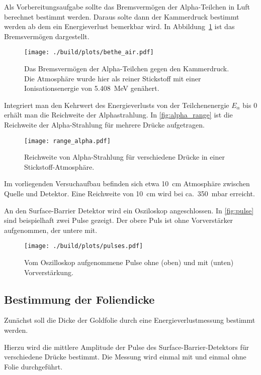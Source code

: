 Als Vorbereitungsaufgabe sollte das Bremsvermögen
der Alpha-Teilchen in Luft berechnet bestimmt werden. Daraus solte dann der Kammerdruck bestimmt werden ab dem  ein Energieverlust
bemerkbar wird. In Abbildung~\ref{fig:bethe} ist das Bremsvermögen dargestellt.

\begin{figure}
  \centering
  \texttt{[image: ./build/plots/bethe\_air.pdf]}
  \caption{Das Bremsvermögen der Alpha-Teilchen gegen den Kammerdruck. Die Atmosphäre wurde hier als reiner Stickstoff mit einer Ionisationsenergie von \SI{5.408}{\MeV} genähert.}
  \label{fig:bethe}
\end{figure}

Integriert man den Kehrwert des Energieverlusts von der Teilchenenergie $E_{\alpha}$ bis $0$ erhält man die Reichweite der Alphastrahlung.
In \autoref{fig:alpha_range} ist die Reichweite der Alpha-Strahlung für mehrere Drücke aufgetragen.

\begin{figure}
  \centering
  \texttt{[image: range\_alpha.pdf]}
  \caption{Reichweite von Alpha-Strahlung für verschiedene Drücke in einer Stickstoff-Atmosphäre.}
  \label{fig:alpha_range}
\end{figure}

Im vorliegenden Versuchaufbau befinden sich etwa \SI{10}{\cm} Atmosphäre zwischen Quelle und Detektor.
Eine Reichweite von \SI{10}{\centi\meter} wird bei ca.\  \SI{350}{\milli\bar} erreicht.

An den Surface-Barrier Detektor wird ein Osziloskop angeschlossen.
In \autoref{fig:pulse} sind beispielhaft zwei Pulse gezeigt.
Der obere Puls ist ohne Vorverstärker aufgenommen, der untere mit.

\begin{figure}
  \centering
  \texttt{[image: ./build/plots/pulses.pdf]}
  \caption{%
    Vom Oszilloskop aufgenommene Pulse ohne (oben) und mit (unten) Vorverstärkung.
  }%
  \label{fig:pulse}
\end{figure}


\subsection{Bestimmung der Foliendicke}

Zunächst soll die Dicke der Goldfolie durch eine Energieverlustmessung bestimmt werden.

Hierzu wird die mittlere Amplitude der Pulse des
Surface-Barrier-Detektors für verschiedene Drücke bestimmt.
Die Messung wird einmal mit und einmal ohne Folie durchgeführt.

